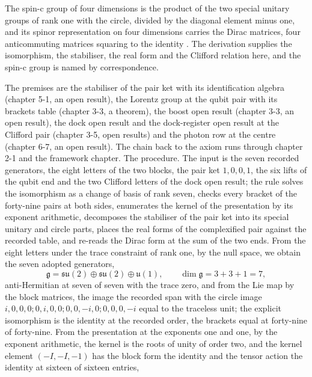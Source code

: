 \begin{chbridge}
The spin-c group of four dimensions is the product of the two special unitary groups of rank one with the circle, divided by the diagonal element minus one, and its spinor representation on four dimensions carries the Dirac matrices, four anticommuting matrices squaring to the identity \cite{Dirac1928,AtiyahBottShapiro1964}. The derivation supplies the isomorphism, the stabiliser, the real form and the Clifford relation here, and the spin-c group is named by correspondence.
\end{chbridge}
\begin{chproof}[finite]
The premises are the stabiliser of the pair ket with its identification algebra (chapter 5-1, an open result), the Lorentz group at the qubit pair with its brackets table (chapter 3-3, a theorem), the boost open result (chapter 3-3, an open result), the dock open result and the dock-register open result at the Clifford pair (chapter 3-5, open results) and the photon row at the centre (chapter 6-7, an open result). The chain back to the axiom runs through chapter 2-1 and the framework chapter. The procedure. The input is the seven recorded generators, the eight letters of the two blocks, the pair ket $1,0,0,1$, the six lifts of the qubit end and the two Clifford letters of the dock open result; the rule solves the isomorphism as a change of basis of rank seven, checks every bracket of the forty-nine pairs at both sides, enumerates the kernel of the presentation by its exponent arithmetic, decomposes the stabiliser of the pair ket into its special unitary and circle parts, places the real forms of the complexified pair against the recorded table, and re-reads the Dirac form at the sum of the two ends. From the eight letters under the trace constraint of rank one, by the null space, we obtain the seven adopted generators,
\begin{equation}
\mathfrak{g} = \mathfrak{su}(2) \oplus \mathfrak{su}(2) \oplus \mathfrak{u}(1) , \qquad \dim \mathfrak{g} = 3 + 3 + 1 = 7 ,
\end{equation}
anti-Hermitian at seven of seven with the trace zero, and from the Lie map by the block matrices, the image the recorded span with the circle image $i,0,0,0;0,i,0,0;0,0,-i,0;0,0,0,-i$ equal to the traceless unit; the explicit isomorphism is the identity at the recorded order, the brackets equal at forty-nine of forty-nine. From the presentation at the exponents one and one, by the exponent arithmetic, the kernel is the roots of unity of order two, and the kernel element $(-I, -I, -1)$ has the block form the identity and the tensor action the identity at sixteen of sixteen entries,

\end{chproof}
